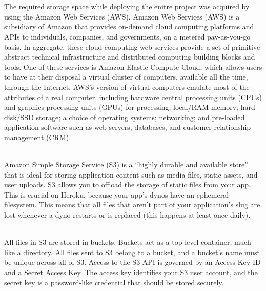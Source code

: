 \documentclass[12pt,a4paper]{report}
\begin{document}
\\
\\
\par
The required storage space while deploying the enitre project was acquired by using the Amazon Web Services (AWS). Amazon Web Services (AWS) is a subsidiary of Amazon that provides on-demand cloud computing platforms and APIs to individuals, companies, and governments, on a metered pay-as-you-go basis. In aggregate, these cloud computing web services provide a set of primitive abstract technical infrastructure and distributed computing building blocks and tools. One of these services is Amazon Elastic Compute Cloud, which allows users to have at their disposal a virtual cluster of computers, available all the time, through the Internet. AWS's version of virtual computers emulate most of the attributes of a real computer, including hardware central processing units (CPUs) and graphics processing units (GPUs) for processing; local/RAM memory; hard-disk/SSD storage; a choice of operating systems; networking; and pre-loaded application software such as web servers, databases, and customer relationship management (CRM).
\\
\\
\par
Amazon Simple Storage Service (S3) is a “highly durable and available store” that is ideal for storing application content such as media files, static assets, and user uploads. S3 allows you to offload the storage of static files from your app. This is crucial on Heroku, because your app’s dynos have an ephemeral filesystem. This means that all files that aren’t part of your application’s slug are lost whenever a dyno restarts or is replaced (this happens at least once daily).
\\
\\
\par
All files in S3 are stored in buckets. Buckets act as a top-level container, much like a directory. All files sent to S3 belong to a bucket, and a bucket’s name must be unique across all of S3. Access to the S3 API is governed by an Access Key ID and a Secret Access Key. The access key identifies your S3 user account, and the secret key is a password-like credential that should be stored securely.
\\
\\

\end{document}
